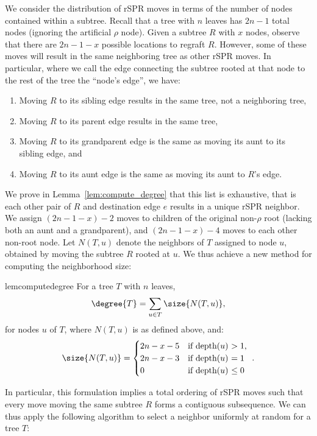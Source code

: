 \documentclass[10pt,twoside,leqno,twocolumn]{article}
\begin{document}
We consider the distribution of rSPR moves in terms of the number of nodes contained within a subtree.
Recall that a tree with $n$ leaves has $2n-1$ total nodes (ignoring the artificial $\rho$ node).
Given a subtree $R$ with $x$ nodes, observe that there are $2n-1 - x$ possible locations to regraft $R$.
However, some of these moves will result in the same neighboring tree as other rSPR moves.
In particular, where we call the edge connecting the subtree rooted at that node to the rest of the tree the ``node's edge'', we have:
\begin{enumerate}
\item Moving $R$ to its sibling edge results in the same tree, not a neighboring tree,
\item Moving $R$ to its parent edge results in the same tree,
\item Moving $R$ to its grandparent edge is the same as moving its aunt to its sibling edge, and
\item Moving $R$ to its aunt edge is the same as moving its aunt to $R$'s edge.
\end{enumerate}
We prove in Lemma~\ref{lem:compute_degree} that this list is exhaustive, that is each other pair of $R$ and destination edge $e$ results in a unique rSPR neighbor.
We assign $(2n-1-x)-2$ moves to children of the original non-$\rho$ root (lacking both an aunt and a grandparent), and $(2n-1-x)-4$ moves to each other non-root node.
Let $N(T,u)$ denote the neighbors of $T$ assigned to node $u$, obtained by moving the subtree $R$ rooted at $u$.
We thus achieve a new method for computing the neighborhood size:

\begin{restatable}{lem}{computedegree}
	\label{lem:compute_degree}
	For a tree $T$ with $n$ leaves,
	$$\degree{T} = \sum_{u \in T} \size{N(T,u)},$$
	for nodes $u$ of $T$, where $N(T,u)$ is as defined above, and:
	$$\size{N(T,u)} = \begin{cases}
		2n - x - 5 &\text{if depth($u$) $ > 1$, } \\
		2n - x - 3 &\text{if depth($u$) $ = 1$ } \\
		0 &\text{if depth($u$) $ \le 0$ } \\
	\end{cases}.$$
\end{restatable}


In particular, this formulation implies a total ordering of rSPR moves such that every move moving the same subtree $R$ forms a contiguous subsequence.
We can thus apply the following algorithm to select a neighbor uniformly at random for a tree $T$:
\end{document}
